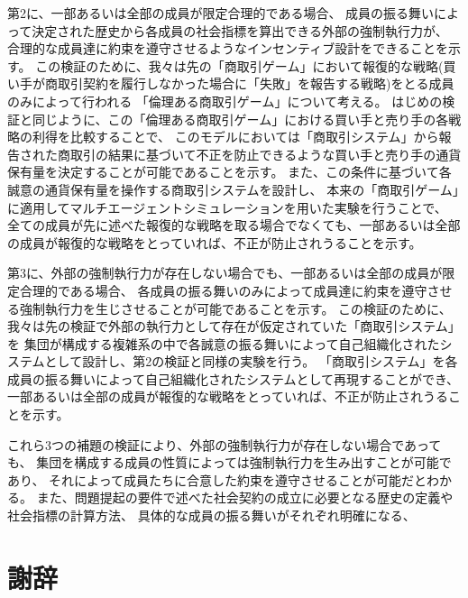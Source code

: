 \documentclass[a4j]{ujreport}
\begin{document}
第2に、一部あるいは全部の成員が限定合理的である場合、
成員の振る舞いによって決定された歴史から各成員の社会指標を算出できる外部の強制執行力が、
合理的な成員達に約束を遵守させるようなインセンティブ設計をできることを示す。
この検証のために、我々は先の「商取引ゲーム」において報復的な戦略(買い手が商取引契約を履行しなかった場合に「失敗」を報告する戦略)をとる成員のみによって行われる
「倫理ある商取引ゲーム」について考える。
はじめの検証と同じように、この「倫理ある商取引ゲーム」における買い手と売り手の各戦略の利得を比較することで、
このモデルにおいては「商取引システム」から報告された商取引の結果に基づいて不正を防止できるような買い手と売り手の通貨保有量を決定することが可能であることを示す。
また、この条件に基づいて各誠意の通貨保有量を操作する商取引システムを設計し、
本来の「商取引ゲーム」に適用してマルチエージェントシミュレーションを用いた実験を行うことで、
全ての成員が先に述べた報復的な戦略を取る場合でなくても、一部あるいは全部の成員が報復的な戦略をとっていれば、不正が防止されうることを示す。

第3に、外部の強制執行力が存在しない場合でも、一部あるいは全部の成員が限定合理的である場合、
各成員の振る舞いのみによって成員達に約束を遵守させる強制執行力を生じさせることが可能であることを示す。
この検証のために、我々は先の検証で外部の執行力として存在が仮定されていた「商取引システム」を
集団が構成する複雑系の中で各誠意の振る舞いによって自己組織化されたシステムとして設計し、第2の検証と同様の実験を行う。
「商取引システム」を各成員の振る舞いによって自己組織化されたシステムとして再現することができ、
一部あるいは全部の成員が報復的な戦略をとっていれば、不正が防止されうることを示す。

これら3つの補題の検証により、外部の強制執行力が存在しない場合であっても、
集団を構成する成員の性質によっては強制執行力を生み出すことが可能であり、
それによって成員たちに合意した約束を遵守させることが可能だとわかる。
また、問題提起の要件で述べた社会契約の成立に必要となる歴史の定義や社会指標の計算方法、
具体的な成員の振る舞いがそれぞれ明確になる、





\chapter*{謝辞}
\end{document}

